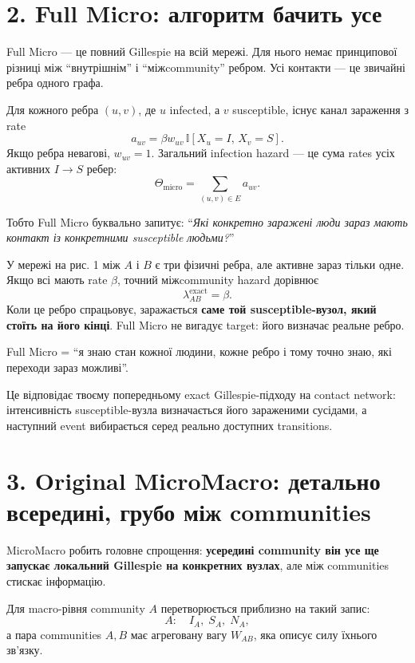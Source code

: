 \documentclass[11pt,a4paper]{article}
\newcommand{\I}{\mathbb{I}}
\begin{document}
\section*{2. Full Micro: алгоритм бачить усе}

Full Micro --- це повний Gillespie на всій мережі. Для нього немає принципової різниці між ``внутрішнім'' і ``міжcommunity'' ребром. Усі контакти --- це звичайні ребра одного графа.

Для кожного ребра $(u,v)$, де $u$ infected, а $v$ susceptible, існує канал зараження з rate
\[
 a_{uv}=\beta w_{uv}\,\I[X_u=I,\,X_v=S].
\]
Якщо ребра невагові, $w_{uv}=1$. Загальний infection hazard --- це сума rates усіх активних $I\to S$ ребер:
\[
 \Theta_{\text{micro}}=\sum_{(u,v)\in E} a_{uv}.
\]

Тобто Full Micro буквально запитує: ``\textit{Які конкретно заражені люди зараз мають контакт із конкретними susceptible людьми?}''

У мережі на рис. 1 між $A$ і $B$ є три фізичні ребра, але активне зараз тільки одне. Якщо всі мають rate $\beta$, точний міжcommunity hazard дорівнює
\[
 \lambda^{\text{exact}}_{AB}=\beta.
\]
Коли це ребро спрацьовує, заражається \textbf{саме той susceptible-вузол, який стоїть на його кінці}. Full Micro не вигадує target: його визначає реальне ребро.

\begin{tcolorbox}[colback=white,colframe=exact,title=Інтуїція]
Full Micro = ``я знаю стан кожної людини, кожне ребро і тому точно знаю, які переходи зараз можливі''.
\end{tcolorbox}

Це відповідає твоєму попередньому exact Gillespie-підходу на contact network: інтенсивність susceptible-вузла визначається його зараженими сусідами, а наступний event вибирається серед реально доступних transitions.

\section*{3. Original MicroMacro: детально всередині, грубо між communities}

MicroMacro робить головне спрощення: \textbf{усередині community він усе ще запускає локальний Gillespie на конкретних вузлах}, але між communities стискає інформацію.

Для macro-рівня community $A$ перетворюється приблизно на такий запис:
\[
 A:\quad I_A,\;S_A,\;N_A,
\]
а пара communities $A,B$ має агреговану вагу $W_{AB}$, яка описує силу їхнього зв'язку.
\end{document}
